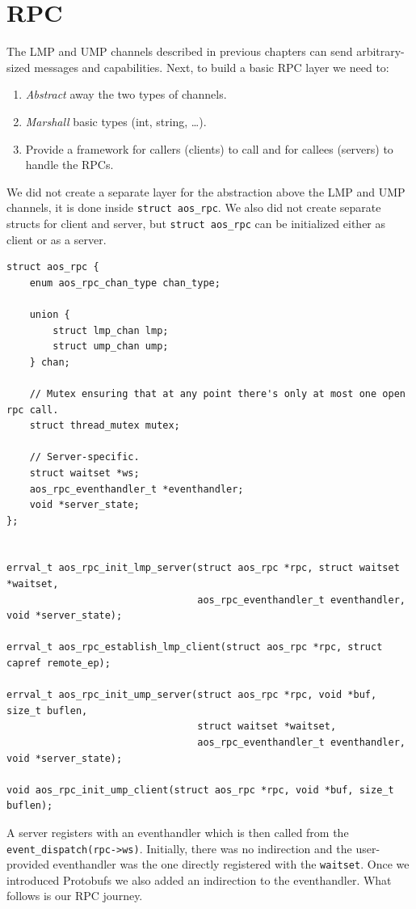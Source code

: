\chapter{RPC}
\label{sec:rpc}

The LMP and UMP channels described in previous chapters can send arbitrary-sized messages and capabilities. Next, to build a basic RPC layer we need to:
\begin{enumerate}
    \item \emph{Abstract} away the two types of channels.
    \item \emph{Marshall} basic types (int, string, \ldots).
    \item Provide a framework for callers (clients) to call and for callees (servers) to handle the RPCs.
\end{enumerate}

We did not create a separate layer for the abstraction above the LMP and UMP channels, it is done inside \texttt{struct aos_rpc}. We also did not create separate structs for client and server, but \texttt{struct aos_rpc} can be initialized either as client or as a server.

\begin{verbatim}
struct aos_rpc {
    enum aos_rpc_chan_type chan_type;

    union {
        struct lmp_chan lmp;
        struct ump_chan ump;
    } chan;

    // Mutex ensuring that at any point there's only at most one open rpc call.
    struct thread_mutex mutex;

    // Server-specific.
    struct waitset *ws;
    aos_rpc_eventhandler_t *eventhandler;
    void *server_state;
};


errval_t aos_rpc_init_lmp_server(struct aos_rpc *rpc, struct waitset *waitset,
                                 aos_rpc_eventhandler_t eventhandler, void *server_state);

errval_t aos_rpc_establish_lmp_client(struct aos_rpc *rpc, struct capref remote_ep);

errval_t aos_rpc_init_ump_server(struct aos_rpc *rpc, void *buf, size_t buflen,
                                 struct waitset *waitset,
                                 aos_rpc_eventhandler_t eventhandler, void *server_state);

void aos_rpc_init_ump_client(struct aos_rpc *rpc, void *buf, size_t buflen);
\end{verbatim}

A server registers with an eventhandler which is then called from the \texttt{event_dispatch(rpc->ws)}. Initially, there was no indirection and the user-provided eventhandler was the one directly registered with the \texttt{waitset}. Once we introduced Protobufs we also added an indirection to the eventhandler.
What follows is our RPC journey.

